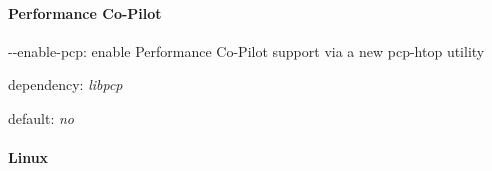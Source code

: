\paragraph*{Performance Co-\/\+Pilot}


\begin{DoxyItemize}
\item {\ttfamily -\/-\/enable-\/pcp}\+: enable Performance Co-\/\+Pilot support via a new pcp-\/htop utility
\begin{DoxyItemize}
\item dependency\+: {\itshape libpcp}
\item default\+: {\itshape no}
\end{DoxyItemize}
\end{DoxyItemize}

\paragraph*{Linux}


